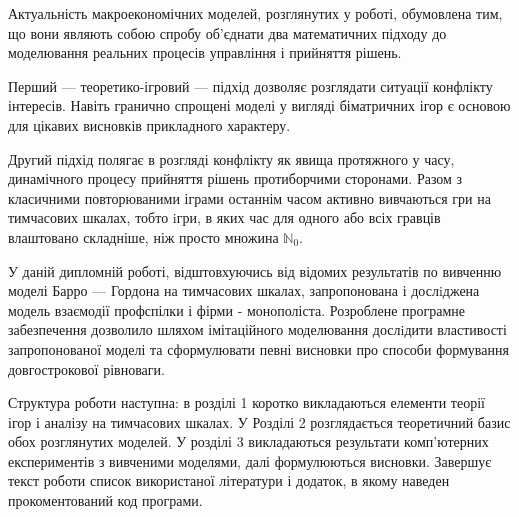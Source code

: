 
Актуальність макроекономічних моделей, розглянутих у роботі, обумовлена
тим, що вони являють собою спробу об'єднати два математичних підходу до
моделювання реальних процесів управління і прийняття рішень. 

Перший --- теоретико-ігровий --- підхід дозволяє розглядати ситуації
конфлікту інтересів. Навіть гранично спрощені моделі у вигляді біматричних ігор
є основою для цікавих висновків прикладного характеру.

Другий підхід полягає в розгляді конфлікту як явища протяжного у
часу, динамічного процесу прийняття рішень протиборчими сторонами.
Разом з класичними повторюваними іграми останнім часом активно
вивчаються гри на тимчасових шкалах, тобто iгри, в яких час для одного або
всіх гравців влаштовано складніше, ніж просто множина $\mathbb{N}_0$.

У даній дипломній роботі, відштовхуючись від відомих результатів по вивченню
моделі Барро --- Гордона на тимчасових шкалах, запропонована і дослiджена модель
взаємодії профспілки і фірми - монополіста.  Розроблене програмне
забезпечення дозволило шляхом імітаційного моделювання дослiдити властивості
запропонованої моделі та сформулювати певні висновки про способи
формування довгострокової рівноваги.

Структура роботи наступна: в розділі 1 коротко викладаються елементи теорії ігор і
аналізу на тимчасових шкалах. У Розділі 2 розглядається теоретичний базис
обох розглянутих моделей. У розділі 3 викладаються результати комп'ютерних
експериментів з вивченими моделями, далі формулюються висновки. Завершує
текст роботи список використаної літератури і додаток, в якому наведен
прокоментований код програми.
